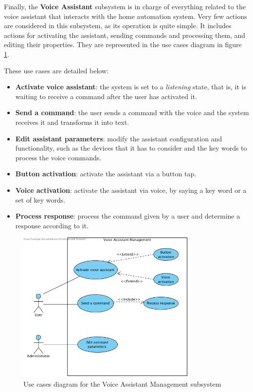 Finally, the \textbf{Voice Assistant} subsystem is in charge of everything related to the voice assistant that interacts with the
home automation system. Very few actions are considered in this subsystem, as its operation is quite simple. It includes actions 
for activating the assistant, sending commands and processing them, and editing their properties. They are represented in the
use cases diagram in figure \ref{fig:UC-voice-assistant-management}.

These use cases are detailed below:
\begin{itemize}
	\item \textbf{Activate voice assistant}: the system is set to a \textit{listening} state, that is, it is waiting to receive a 
	command after the user has activated it.
	\item \textbf{Send a command}: the user sends a command with the voice and the system receives it and transforms it into text.
	\item \textbf{Edit assistant parameters}: modify the assistant configuration and functionality, such as the devices that it has
	to consider and the key words to process the voice commands.
	\item \textbf{Button activation}: activate the assistant via a button tap.
	\item \textbf{Voice activation}: activate the assistant via voice, by saying a key word or a set of key words.
	\item \textbf{Process response}: process the command given by a user and determine a response according to it.
\end{itemize}

\begin{figure}
	\centering
	\includegraphics[width=0.8\textwidth]{images/Chapter_07/UC-voice-assistant-management.png}
	\caption{Use cases diagram for the Voice Assistant Management subsystem}
	\label{fig:UC-voice-assistant-management}
\end{figure}

